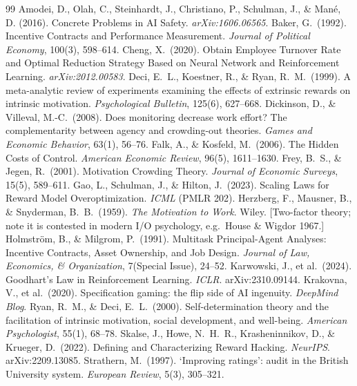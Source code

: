 \documentclass[11pt]{article}
\begin{document}
\begin{thebibliography}{99}
\small
{} Amodei, D., Olah, C., Steinhardt, J., Christiano, P., Schulman, J., \& Man\'e, D. (2016). Concrete Problems in AI Safety. \emph{arXiv:1606.06565}.
 Baker, G.\ (1992). Incentive Contracts and Performance Measurement. \emph{Journal of Political Economy}, 100(3), 598--614.
 Cheng, X.\ (2020). Obtain Employee Turnover Rate and Optimal Reduction Strategy Based on Neural Network and Reinforcement Learning. \emph{arXiv:2012.00583}.
 Deci, E.\ L., Koestner, R., \& Ryan, R.\ M.\ (1999). A meta-analytic review of experiments examining the effects of extrinsic rewards on intrinsic motivation. \emph{Psychological Bulletin}, 125(6), 627--668.
 Dickinson, D., \& Villeval, M.-C.\ (2008). Does monitoring decrease work effort? The complementarity between agency and crowding-out theories. \emph{Games and Economic Behavior}, 63(1), 56--76.
 Falk, A., \& Kosfeld, M.\ (2006). The Hidden Costs of Control. \emph{American Economic Review}, 96(5), 1611--1630.
 Frey, B.\ S., \& Jegen, R.\ (2001). Motivation Crowding Theory. \emph{Journal of Economic Surveys}, 15(5), 589--611.
 Gao, L., Schulman, J., \& Hilton, J.\ (2023). Scaling Laws for Reward Model Overoptimization. \emph{ICML} (PMLR 202).
 Herzberg, F., Mausner, B., \& Snyderman, B.\ B.\ (1959). \emph{The Motivation to Work}. Wiley. [Two-factor theory; note it is contested in modern I/O psychology, e.g.\ House \& Wigdor 1967.]
 Holmstr\"om, B., \& Milgrom, P.\ (1991). Multitask Principal-Agent Analyses: Incentive Contracts, Asset Ownership, and Job Design. \emph{Journal of Law, Economics, \& Organization}, 7(Special Issue), 24--52.
 Karwowski, J., et al.\ (2024). Goodhart's Law in Reinforcement Learning. \emph{ICLR}. arXiv:2310.09144.
 Krakovna, V., et al.\ (2020). Specification gaming: the flip side of AI ingenuity. \emph{DeepMind Blog}.
 Ryan, R.\ M., \& Deci, E.\ L.\ (2000). Self-determination theory and the facilitation of intrinsic motivation, social development, and well-being. \emph{American Psychologist}, 55(1), 68--78.
 Skalse, J., Howe, N.\ H.\ R., Krasheninnikov, D., \& Krueger, D.\ (2022). Defining and Characterizing Reward Hacking. \emph{NeurIPS}. arXiv:2209.13085.
 Strathern, M.\ (1997). `Improving ratings': audit in the British University system. \emph{European Review}, 5(3), 305--321.
\end{thebibliography}
\end{document}
